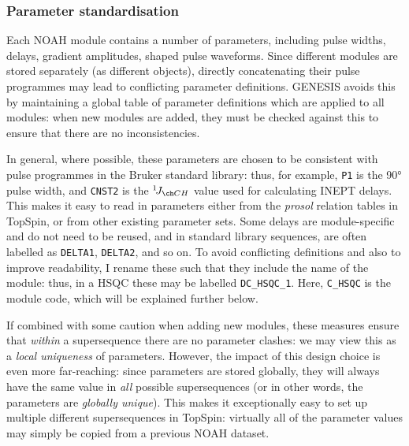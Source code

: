 \subsubsection{Parameter standardisation}

Each NOAH module contains a number of parameters, including pulse widths, delays, gradient amplitudes, shaped pulse waveforms.
Since different modules are stored separately (as different objects), directly concatenating their pulse programmes may lead to conflicting parameter definitions.
GENESIS avoids this by maintaining a global table of parameter definitions which are applied to all modules: when new modules are added, they must be checked against this to ensure that there are no inconsistencies.

In general, where possible, these parameters are chosen to be consistent with pulse programmes in the Bruker standard library: thus, for example, \texttt{P1} is the \proton{} \ang{90} pulse width, and \texttt{CNST2} is the $\oneJ{CH}$ value used for calculating INEPT delays.
This makes it easy to read in parameters either from the \textit{prosol} relation tables in TopSpin, or from other existing parameter sets.
Some delays are module-specific and do not need to be reused, and in standard library sequences, are often labelled as \texttt{DELTA1}, \texttt{DELTA2}, and so on.
To avoid conflicting definitions and also to improve readability, I rename these such that they include the name of the module: thus, in a \carbon{} HSQC these may be labelled \texttt{DC\_HSQC\_1}.
Here, \texttt{C\_HSQC} is the module code, which will be explained further below.

If combined with some caution when adding new modules, these measures ensure that \textit{within} a supersequence there are no parameter clashes: we may view this as a \textit{local uniqueness} of parameters.
However, the impact of this design choice is even more far-reaching:
since parameters are stored globally, they will always have the same value in \textit{all} possible supersequences (or in other words, the parameters are \textit{globally unique}).
This makes it exceptionally easy to set up multiple different supersequences in TopSpin: virtually all of the parameter values may simply be copied from a previous NOAH dataset.

